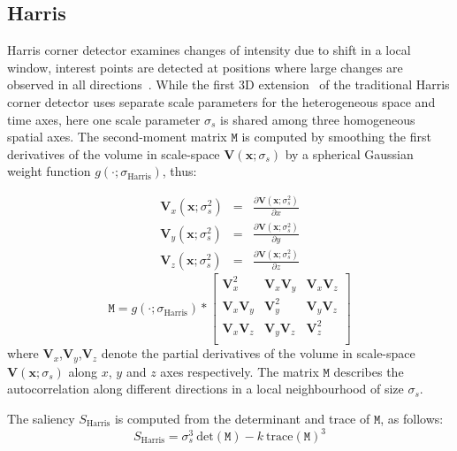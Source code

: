 \subsection{Harris}
Harris corner detector examines changes of intensity due to shift in a local window, interest points are detected at positions where large changes are observed in all directions~\cite{Harris1988}. While the first 3D extension~\cite{Laptev2005} of the traditional Harris corner detector uses separate scale parameters for the heterogeneous space and time axes, here one scale parameter $\sigma_s$ is shared among three homogeneous spatial axes. 
The second-moment matrix $\mathtt{M}$ is computed by smoothing the first derivatives of the volume in scale-space $\mathbf{V}(\mathbf{x};\sigma_s)$ by a spherical Gaussian weight function $g(\cdot;\sigma_\textrm{Harris})$, thus: 

\begin{equation}
\begin{array}{rcl}
\mathbf{V}_x(\mathbf{x};\sigma^2_s) &= &\displaystyle\frac{\partial \mathbf{V}(\mathbf{x};\sigma^2_s)}{\partial x} \\
\mathbf{V}_y(\mathbf{x};\sigma^2_s) &= &\displaystyle\frac{\partial \mathbf{V}(\mathbf{x};\sigma^2_s)}{\partial y} \\
\mathbf{V}_z(\mathbf{x};\sigma^2_s) &= &\displaystyle\frac{\partial \mathbf{V}(\mathbf{x};\sigma^2_s)}{\partial z}
\end{array}
\end{equation}
\begin{equation}
\mathtt{M} = g(\cdot;\sigma_\textrm{Harris}) \ast \left[
\begin{array}{ccc}
\mathbf{V}^2_x & \mathbf{V}_x\mathbf{V}_y & \mathbf{V}_x\mathbf{V}_z \\
\mathbf{V}_x\mathbf{V}_y & \mathbf{V}_y^2 & \mathbf{V}_y\mathbf{V}_z \\
\mathbf{V}_x\mathbf{V}_z & \mathbf{V}_y\mathbf{V}_z & \mathbf{V}^2_z \\
\end{array}
\right]
\label{eq:harris_2ndmoment}
\end{equation}
where $\mathbf{V}_x$,$\mathbf{V}_y$,$\mathbf{V}_z$ denote the partial derivatives of the volume in scale-space $\mathbf{V}(\mathbf{x};\sigma_s)$ along $x$, $y$ and $z$ axes respectively. 
The matrix $\mathtt{M}$ describes the autocorrelation along different directions in a local neighbourhood of size $\sigma_s$. 

The saliency $S_\textrm{Harris}$ is computed from the determinant and trace of $\mathtt{M}$, as follows:
\begin{equation}
S_\textrm{Harris} = \sigma_{s}^3 \:\mathrm{det}(\mathtt{M}) - k\:\mathrm{trace(\mathtt{M})}^3
\label{eq:harriscorner}
\end{equation}

